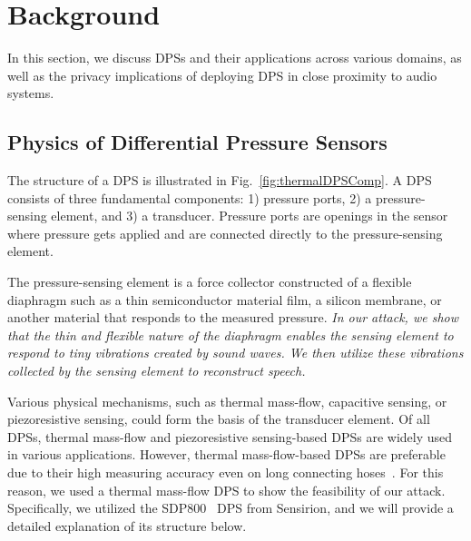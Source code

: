 
\section{Background}



In this section, we discuss DPSs and their applications across various domains, as well as the privacy implications of deploying DPS in close proximity to audio systems.

\subsection{Physics of Differential Pressure Sensors}
\label{subsection:physicsofDPS}
The structure of a DPS is illustrated in Fig.~\ref{fig:thermalDPSComp}. A DPS consists of three fundamental components: 1) pressure ports, 2) a pressure-sensing element, and 3) a transducer. Pressure ports are openings in the sensor where pressure gets applied and are connected directly to the pressure-sensing element.

The pressure-sensing element is a force collector constructed of a flexible diaphragm such as a thin semiconductor material film, a silicon membrane, or another material that responds to the measured pressure. \textit{In our attack, we show that the thin and flexible nature of the diaphragm enables the sensing element to respond to tiny vibrations created by sound waves. We then utilize these vibrations collected by the sensing element to reconstruct speech.}

Various physical mechanisms, such as thermal mass-flow, capacitive sensing, or piezoresistive sensing, could form the basis of the transducer element.
Of all DPSs, thermal mass-flow and piezoresistive sensing-based DPSs are widely used in various applications. However, thermal mass-flow-based DPSs are preferable due to their high measuring accuracy even on long connecting hoses~\cite{firstsensor:2020}. For this reason, we used a thermal mass-flow DPS to show the feasibility of our attack.
Specifically, we utilized the SDP800~\cite{datasheetsdp} DPS from Sensirion, and we will provide a detailed explanation of its structure below.

